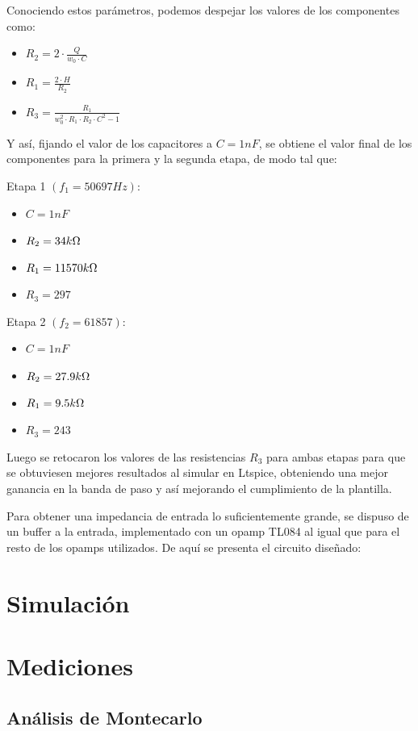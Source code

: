 \documentclass[../../tc_tp5_main.tex]{subfiles}
\begin{document}
 	Conociendo estos parámetros, podemos despejar los valores de los componentes como:
 	 	\begin{itemize}
 		\item $R_2 = 2\cdot \frac{Q}{w_0\cdot C}$
 		\item $R_1 = \frac{2\cdot H}{R_2}$
 		\item $R_3 = \frac{R_1}{w_0^2\cdot R_1\cdot R_2 \cdot C^2 - 1}$
 	\end{itemize}
 	
 	Y así, fijando el valor de los capacitores a $C = 1 nF$,  se obtiene el valor final de los componentes para la primera y la segunda etapa, de modo tal que: \par
 	 Etapa 1 $(f_1 = 50697 Hz)$:\par
 	 \par
 	\begin{itemize}
 		\item $C = 1 nF$
 		\item $R_2 = 34 k\ohm$
 		\item $R_1 = 11570 k\ohm$
 		\item $R_3 = 297$
 	\end{itemize}
 	 Etapa 2 $(f_2 = 61857)$: \par
 	 \par
 	  	\begin{itemize}
 		\item $C = 1 nF$
 		\item $R_2 = 27.9k\ohm$
 		\item $R_1 = 9.5 k\ohm$
 		\item $R_3 = 243$
 	\end{itemize}
 	
 	Luego se retocaron los valores de las resistencias $R_3$ para ambas etapas para que se obtuviesen mejores resultados al simular en Ltspice, obteniendo una mejor ganancia en la banda de paso y así mejorando el cumplimiento de la plantilla.\par
 	Para obtener una impedancia de entrada lo suficientemente grande, se dispuso de un buffer a la entrada, implementado con un opamp TL084 al igual que para el resto de los opamps utilizados. 
 	De aquí se presenta el circuito diseñado: \par
 	
 	 \section{Simulación}
		
 	 \section{Mediciones}
 	 
 	 \subsection{Análisis de Montecarlo}
 	 \subsection{}
\clearpage\newpage
\end{document}
